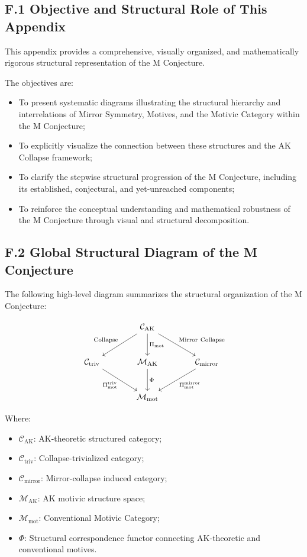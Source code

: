 \documentclass[11pt]{article}
\begin{document}
\subsection*{F.1 Objective and Structural Role of This Appendix}

This appendix provides a comprehensive, visually organized, and mathematically rigorous structural representation of the M Conjecture.

The objectives are:

\begin{itemize}
    \item To present systematic diagrams illustrating the structural hierarchy and interrelations of Mirror Symmetry, Motives, and the Motivic Category within the M Conjecture;
    \item To explicitly visualize the connection between these structures and the AK Collapse framework;
    \item To clarify the stepwise structural progression of the M Conjecture, including its established, conjectural, and yet-unreached components;
    \item To reinforce the conceptual understanding and mathematical robustness of the M Conjecture through visual and structural decomposition.
\end{itemize}

\subsection*{F.2 Global Structural Diagram of the M Conjecture}

The following high-level diagram summarizes the structural organization of the M Conjecture:

\[
\begin{tikzcd}[column sep=large, row sep=large]
& \mathcal{C}_{\mathrm{AK}} \arrow[dl, "\mathrm{Collapse}"'] \arrow[d, "\Pi_{\mathrm{mot}}"] \arrow[dr, "\mathrm{Mirror\ Collapse}"] \\
\mathcal{C}_{\mathrm{triv}} \arrow[dr, "\Pi_{\mathrm{mot}}^{\mathrm{triv}}"'] 
& \mathcal{M}_{\mathrm{AK}} \arrow[d, "\Phi"] 
& \mathcal{C}_{\mathrm{mirror}} \arrow[dl, "\Pi_{\mathrm{mot}}^{\mathrm{mirror}}"] \\
& \mathcal{M}_{\mathrm{mot}} 
\end{tikzcd}
\]

Where:

\begin{itemize}
    \item $\mathcal{C}_{\mathrm{AK}}$: AK-theoretic structured category;
    \item $\mathcal{C}_{\mathrm{triv}}$: Collapse-trivialized category;
    \item $\mathcal{C}_{\mathrm{mirror}}$: Mirror-collapse induced category;
    \item $\mathcal{M}_{\mathrm{AK}}$: AK motivic structure space;
    \item $\mathcal{M}_{\mathrm{mot}}$: Conventional Motivic Category;
    \item $\Phi$: Structural correspondence functor connecting AK-theoretic and conventional motives.
\end{itemize}
\end{document}

